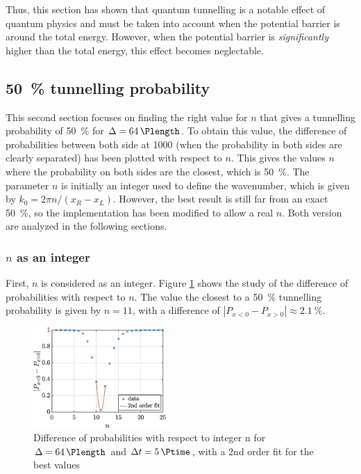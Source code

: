 \documentclass[a4paper,12pt,twoside]{article}
\newcommand{\abs}[1]{\left|#1\right|}
\begin{document}
    Thus, this section has shown that quantum tunnelling is a notable effect of quantum physics and must be taken into account when the potential barrier is around the total energy.
    However, when the potential barrier is \textit{significantly} higher than the total energy, this effect becomes neglectable.\\

  \subsection{\SI{50}{\percent} tunnelling probability}
    This second section focuses on finding the right value for $n$ that gives a tunnelling probability of \SI{50}{\percent} for $\Delta = \SI{64}{\Plength}$.
    To obtain this value, the difference of probabilities between both side at \SI{1000}{\Ptime} (when the probability in both sides are clearly separated) has been plotted with respect to $n$.
    This gives the values $n$ where the probability on both sides are the closest, which is \SI{50}{\percent}.
    The parameter $n$ is initially an integer used to define the wavenumber, which is given by $k_0 = 2\pi n/(x_R-x_L)$.
    However, the best result is still far from an exact \SI{50}{\percent}, so the implementation has been modified to allow a real $n$.
    Both version are analyzed in the following sections.\\

    \subsubsection{$n$ as an integer}
      First, $n$ is considered as an integer.
      Figure \ref{fig:iii_findn_n} shows the study of the difference of probabilities with respect to $n$.
      The value the closest to a \SI{50}{\percent} tunnelling probability is given by $n = 11$, with a difference of $\abs{P_{x<0} - P_{x>0}} \approx \SI{2.1}{\percent}$.\\

      \begin{figure}[h]
        \centering
        \includegraphics[width=0.45\textwidth]{graphs/iii_findn_n_approx.eps}
        \caption{Difference of probabilities with respect to integer n for $\Delta = \SI{64}{\Plength}$ and $\Delta t = \SI{5}{\Ptime}$, with a 2nd order fit for the best values}
        \label{fig:iii_findn_n}
      \end{figure}
\end{document}
